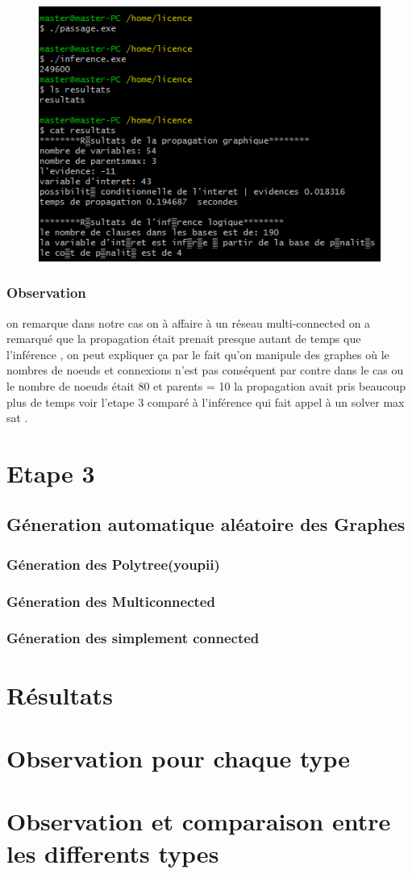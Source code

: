 \documentclass[12pt,a4paper,oneside]{book}
\begin{document}
      		\begin{figure}[H]
      				\centering
      			\includegraphics[scale=1.1]{screens/etape2.png}%
      			\label{labelname}%
      		\end{figure}
        
        
        \subsubsection{Observation}
        on remarque dans notre cas on à affaire à un réseau multi-connected on a remarqué que la propagation était prenait presque autant de temps que l'inférence , on peut expliquer ça par le fait qu'on manipule des graphes où le nombres de noeuds et connexions n'est pas conséquent par contre dans le cas ou le nombre de noeuds était 80 et parents = 10 la propagation avait pris beaucoup plus de temps  voir l'etape 3 comparé à l'inférence qui fait appel à un solver max sat .

       
    \section{Etape 3}
    \subsection{Géneration automatique aléatoire des Graphes}
    \subsubsection{Géneration des Polytree(youpii)}
    \subsubsection{Géneration des Multiconnected}
    \subsubsection{Géneration des simplement connected}
    \section{Résultats}
    
    \section{Observation pour chaque type }
    \section{Observation et comparaison entre les differents types}
\end{document}
